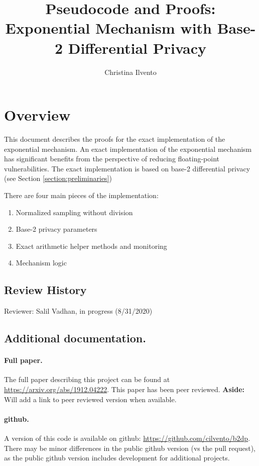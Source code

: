 \documentclass[11pt]{article}
\title{Pseudocode and Proofs: Exponential Mechanism with Base-2 Differential Privacy}
\author{Christina Ilvento}
\date{}
\theoremstyle{definition}
\newcommand{\aside}[1]{{\color{teal} \textbf{Aside:} #1}}
\begin{document}
\maketitle
\tableofcontents

\section{Overview}
This document describes the proofs for the exact implementation of the exponential mechanism. An exact implementation of the exponential mechanism has significant benefits from the perspective of reducing floating-point vulnerabilities. The exact implementation is based on base-2 differential privacy (see Section \ref{section:preliminaries})

There are four main pieces of the implementation:
\begin{enumerate}
    \item Normalized sampling without division
    \item Base-2 privacy parameters 
    \item Exact arithmetic helper methods and monitoring
    \item Mechanism logic
\end{enumerate}

\subsection{Review History}
Reviewer: Salil Vadhan, in progress (8/31/2020)

\subsection{Additional documentation.}
\paragraph{Full paper.} The full paper describing this project can be found at \href{https://arxiv.org/abs/1912.04222}{https://arxiv.org/abs/1912.04222}. This paper has been peer reviewed. \aside{Will add a link to peer reviewed version when available.}

\paragraph{github.} A version of this code is available on github: \href{https://github.com/cilvento/b2dp}{https://github.com/cilvento/b2dp}. There may be minor differences in the public github version (vs the pull request), as the public github version includes development for additional projects. 
\end{document}
